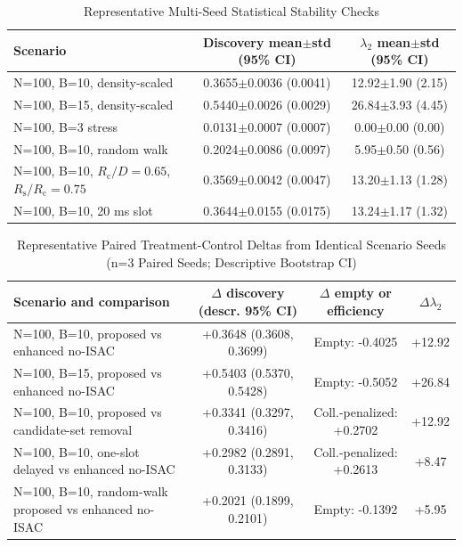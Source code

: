 \documentclass[journal]{IEEEtran}
\newcommand{\Rc}{R_{\mathrm{c}}}
\newcommand{\Rs}{R_{\mathrm{s}}}
\begin{document}
\begin{table}[!t]
  \centering
  \caption{Representative Multi-Seed Statistical Stability Checks}
  \label{tab:supp_stat_examples}
  \scriptsize
  \begin{tabular}{p{}cc}
    \toprule
    Scenario & Discovery mean$\pm$std (95\% CI) & $\lambda_2$ mean$\pm$std (95\% CI) \\
    \midrule
    N=100, B=10, density-scaled & 0.3655$\pm$0.0036 (0.0041) & 12.92$\pm$1.90 (2.15) \\
    N=100, B=15, density-scaled & 0.5440$\pm$0.0026 (0.0029) & 26.84$\pm$3.93 (4.45) \\
    N=100, B=3 stress & 0.0131$\pm$0.0007 (0.0007) & 0.00$\pm$0.00 (0.00) \\
    N=100, B=10, random walk & 0.2024$\pm$0.0086 (0.0097) & 5.95$\pm$0.50 (0.56) \\
    N=100, B=10, $\Rc/D=0.65$, $\Rs/\Rc=0.75$ & 0.3569$\pm$0.0042 (0.0047) & 13.20$\pm$1.13 (1.28) \\
    N=100, B=10, 20 ms slot & 0.3644$\pm$0.0155 (0.0175) & 13.24$\pm$1.17 (1.32) \\
    \bottomrule
  \end{tabular}
\end{table}

\begin{table}[!t]
  \centering
  \caption{Representative Paired Treatment-Control Deltas from Identical Scenario Seeds (n=3 Paired Seeds; Descriptive Bootstrap CI)}
  \label{tab:supp_paired_delta}
  \scriptsize
  \setlength{\tabcolsep}{3pt}
  \begin{tabular}{p{}ccc}
    \toprule
    Scenario and comparison & $\Delta$ discovery (descr. 95\% CI) & $\Delta$ empty or efficiency & $\Delta\lambda_2$ \\
    \midrule
    N=100, B=10, proposed vs enhanced no-ISAC & +0.3648 (0.3608, 0.3699) & Empty: -0.4025 & +12.92 \\
    N=100, B=15, proposed vs enhanced no-ISAC & +0.5403 (0.5370, 0.5428) & Empty: -0.5052 & +26.84 \\
    N=100, B=10, proposed vs candidate-set removal & +0.3341 (0.3297, 0.3416) & Coll.-penalized: +0.2702 & +12.92 \\
    N=100, B=10, one-slot delayed vs enhanced no-ISAC & +0.2982 (0.2891, 0.3133) & Coll.-penalized: +0.2613 & +8.47 \\
    N=100, B=10, random-walk proposed vs enhanced no-ISAC & +0.2021 (0.1899, 0.2101) & Empty: -0.1392 & +5.95 \\
    \bottomrule
  \end{tabular}
\end{table}
\end{document}
